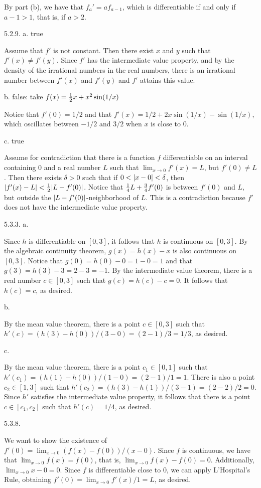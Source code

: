 By part (b), we have that $f_a' = af_{a-1}$,
which is differentiable if and only if $a - 1 > 1$, that is,
if $a > 2$.
\bigskip
\item{5.2.9.} a. true

Assume that $f'$ is not constant.
Then there exist $x$ and $y$ such that $f'(x) \ne f'(y)$.
Since $f'$ has the intermediate value property,
and by the density of the irrational numbers in the real numbers,
there is an irrational number between $f'(x)$ and $f'(y)$
and $f'$ attains this value.
\medskip
\item{} b. false: take $f(x) = {1 \over 2} x + x^2 \sin (1/x)$

Notice that $f'(0) = 1/2$ and that
$f'(x) = 1/2 + 2x \sin (1/x) - \sin (1/x)$,
which oscillates between $-1/2$ and $3/2$ when $x$ is close to $0$.
\medskip
\item{} c. true

Assume for contradiction that there is a function $f$
differentiable on an interval containing $0$ and a real number $L$
such that $\lim _{x \to 0} f'(x) = L$, but $f'(0) \ne L$.
Then there exists $\delta > 0$ such that if $0 < \vert x - 0\vert < \delta$,
then $\vert f'(x) - L\vert < {1 \over 2} \vert L - f'(0)\vert$.
Notice that ${1 \over 4} L + {3 \over 4} f'(0)$ is between $f'(0)$ and $L$,
but outside the $\vert L - f'(0)\vert$-neighborhood of $L$.
This is a contradiction because
$f'$ does not have the intermediate value property.
\bigskip
\item{5.3.3.} a.

Since $h$ is differentiable on $[0,3]$,
it follows that $h$ is continuous on $[0,3]$.
By the algebraic continuity theorem,
$g(x) = h(x) - x$ is also continuous on $[0,3]$.
Notice that $g(0) = h(0) - 0 = 1 - 0 = 1$
and that $g(3) = h(3) - 3 = 2 - 3 = -1$.
By the intermediate value theorem,
there is a real number $c \in [0,3]$ such that $g(c) = h(c) - c = 0$.
It follows that $h(c) = c$, as desired.
\medskip
\item{} b.

By the mean value theorem,
there is a point $c \in [0,3]$ such that
$h'(c) = (h(3) - h(0)) / (3 - 0) = (2 - 1) / 3 = 1/3$,
as desired.
\medskip
\item{} c.

By the mean value theorem, there is a point $c_1 \in [0,1]$ such that
$h'(c_1) = (h(1) - h(0)) / (1 - 0) = (2 - 1) / 1 = 1$.
There is also a point $c_2 \in [1,3]$ such that
$h'(c_2) = (h(3) - h(1)) / (3 - 1) = (2 - 2) / 2 = 0$.
Since $h'$ satisfies the intermediate value property,
it follows that there is a point $c \in [c_1, c_2]$ such that
$h'(c) = 1/4$, as desired.
\bigskip
\item{5.3.8.}

We want to show the existence of
$f'(0) = \lim _{x \to 0} (f(x) - f(0)) / (x - 0)$.
Since $f$ is continuous, we have that $\lim _{x \to 0} f(x) = f(0)$, that is,
$\lim _{x \to 0} f(x) - f(0) = 0$.
Additionally, $\lim _{x \to 0} x - 0 = 0$.
Since $f$ is differentiable close to $0$, we can apply L'Hospital's Rule,
obtaining $f'(0) = \lim _{x \to 0} f'(x) / 1 = L$, as desired.
\bye
